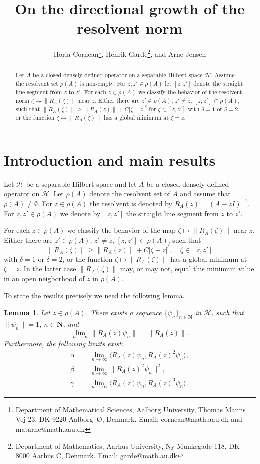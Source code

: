 \documentclass[12pt,a4paper]{article}
\title{On the directional growth of the resolvent norm}
\author{
Horia Cornean\footnote{Department of Mathematical Sciences, Aalborg University, Thomas Manns Vej 23, DK-9220 Aalborg~\O{}, Denmark. Email: cornean@math.aau.dk and matarne@math.aau.dk},\;
Henrik Garde\footnote{Department of Mathematics, Aarhus University, Ny Munkegade 118, DK-8000 Aarhus C, Denmark. Email: garde@math.au.dk},\; and
Arne Jensen\footnotemark[1]
}
\date{}
\numberwithin{equation}{section}
\theoremstyle{plain}
\newtheorem{lemma}[theorem]{Lemma}
\theoremstyle{definition}
\newcommand{\abs}[1]{\lvert{#1}\rvert}  %
\newcommand{\norm}[1]{\lVert{#1}\rVert} %
\newcommand{\ip}[2]{\langle{#1},{#2}\rangle} %
\newcommand{\cH}{\mathcal{H}}
\newcommand{\bN}{\mathbf{N}}
\begin{document}
\maketitle

\begin{abstract}
	
Let $A$ be a closed densely defined operator on a separable Hilbert space $\mathcal{H}$. Assume the resolvent set $\rho(A)$ is non-empty. For $z,z'\in\rho(A)$ let $[z,z']$ denote the straight line segment from $z$ to $z'$. For each $z\in\rho(A)$ we classify the behavior of the resolvent norm $\zeta\mapsto\norm{R_A(\zeta)}$ near $z$. Either there are $z'\in\rho(A)$, $z'\neq z$, $[z,z']\subset\rho(A)$, such that $\norm{R_A(\zeta)}\geq\norm{R_A(z)} + C\abs{\zeta-z}^\delta$ for $\zeta\in[z,z']$ with $\delta=1$ or $\delta=2$, or the function $\zeta\mapsto\norm{R_A(\zeta)}$ has a global minimum at $\zeta=z$. 

\end{abstract}


\section{Introduction and main results}

Let $\mathcal{H}$ be a separable Hilbert space and let $A$ be a closed densely defined operator on $\mathcal{H}$. Let $\rho(A)$ denote the resolvent set of $A$ and assume that $\rho(A)\neq\emptyset$. For $z\in \rho(A)$ the resolvent is denoted by $R_A(z)=(A-zI)^{-1}$. For $z,z'\in\rho(A)$ we denote by $[z,z']$ the straight line segment from $z$ to $z'$. 

For each $z\in\rho(A)$ we classify the behavior of the map $\zeta\mapsto\norm{R_A(\zeta)}$ near $z$. Either there are $z'\in\rho(A)$, $z'\neq z$, $[z,z']\subset\rho(A)$, such that 
%
\begin{equation*}
	\norm{R_A(\zeta)}\geq\norm{R_A(z)} + C\abs{\zeta-z}^\delta, \quad \zeta\in[z,z']
\end{equation*}
%
with $\delta=1$ or $\delta=2$, or the function $\zeta\mapsto\norm{R_A(\zeta)}$ has a global minimum at $\zeta=z$. In the latter case $\norm{R_A(\zeta)}$ may, or may not, equal this minimum value in an open neigborhood of $z$ in $\rho(A)$.

To state the results precisely we need the following lemma.

\begin{lemma}\label{lemma-abg}
	Let $z\in\rho(A)$. There exists a sequence $\{\psi_n\}_{n\in\bN}$ in $\cH$, such that $\norm{\psi_n}=1$, $n\in\bN$, and 
	\begin{equation}\label{R-lim}
		\lim_{n\to\infty}\norm{R_A(z)\psi_n}=\norm{R_A(z)}.
	\end{equation}
	Furthermore, the following limits exist:
	\begin{align}
		\alpha &=\lim_{n\to\infty} \ip{R_A(z)\psi_n}{R_A(z)^2\psi_n},\label{alpha}\\
		\beta &= \lim_{n\to\infty}\norm{R_A(z)^2\psi_n}^2,\label{beta}\\
		\gamma &= \lim_{n\to\infty}\ip{R_A(z)\psi_n}{R_A(z)^3\psi_n}.\label{gamma} 
	\end{align}
\end{lemma} 
\end{document}
